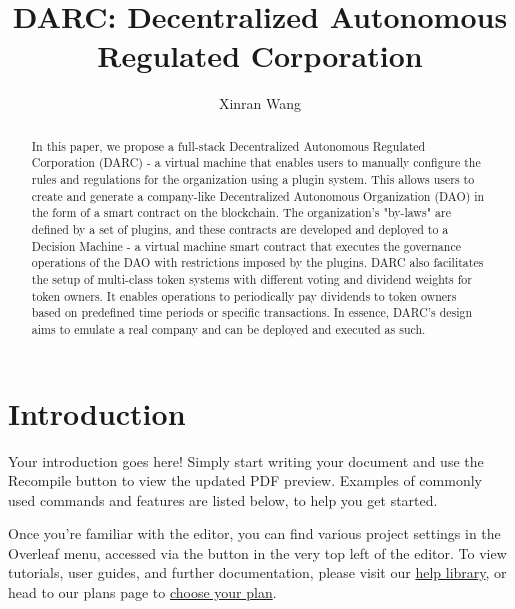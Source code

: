\documentclass{article}
\title{DARC: Decentralized Autonomous Regulated Corporation}
\author{Xinran Wang}
\begin{document}
\maketitle

\begin{abstract}
In this paper, we propose a full-stack Decentralized Autonomous Regulated Corporation (DARC) - a virtual machine that enables users to manually configure the rules and regulations for the organization using a plugin system. This allows users to create and generate a company-like Decentralized Autonomous Organization (DAO) in the form of a smart contract on the blockchain. The organization's "by-laws" are defined by a set of plugins, and these contracts are developed and deployed to a Decision Machine - a virtual machine smart contract that executes the governance operations of the DAO with restrictions imposed by the plugins. DARC also facilitates the setup of multi-class token systems with different voting and dividend weights for token owners. It enables operations to periodically pay dividends to token owners based on predefined time periods or specific transactions. In essence, DARC's design aims to emulate a real company and can be deployed and executed as such.
\end{abstract}

\section{Introduction}

Your introduction goes here! Simply start writing your document and use the Recompile button to view the updated PDF preview. Examples of commonly used commands and features are listed below, to help you get started.

Once you're familiar with the editor, you can find various project settings in the Overleaf menu, accessed via the button in the very top left of the editor. To view tutorials, user guides, and further documentation, please visit our \href{https://www.overleaf.com/learn}{help library}, or head to our plans page to \href{https://www.overleaf.com/user/subscription/plans}{choose your plan}.






































\end{document}
